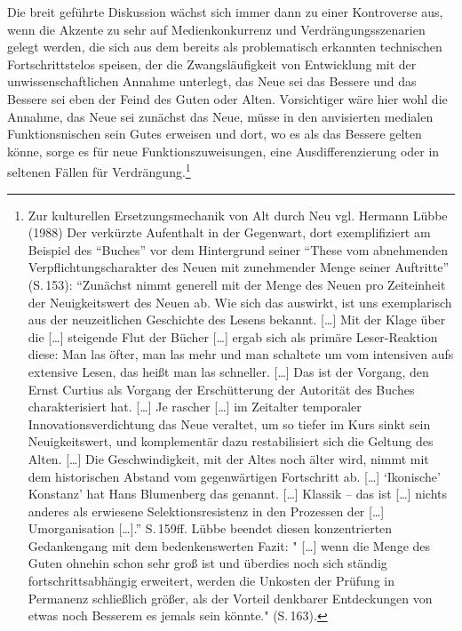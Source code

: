 \documentclass[a4paper,
fontsize=11pt,
oneside,
numbers=noperiodatend,
parskip=half-,
bibliography=totoc,
final
]{scrartcl}
\begin{document}
Die breit geführte Diskussion wächst sich immer dann zu einer
Kontroverse aus, wenn die Akzente zu sehr auf Medienkonkurrenz und
Verdrängungsszenarien gelegt werden, die sich aus dem bereits als
problematisch erkannten technischen Fortschrittstelos speisen, der die
Zwangsläufigkeit von Entwicklung mit der unwissenschaftlichen Annahme
unterlegt, das Neue sei das Bessere und das Bessere sei eben der Feind
des Guten oder Alten. Vorsichtiger wäre hier wohl die Annahme, das Neue
sei zunächst das Neue, müsse in den anvisierten medialen
Funktionsnischen sein Gutes erweisen und dort, wo es als das Bessere
gelten könne, sorge es für neue Funktionszuweisungen, eine
Ausdifferenzierung oder in seltenen Fällen für Verdrängung.\footnote{Zur
  kulturellen Ersetzungsmechanik von Alt durch Neu vgl. Hermann Lübbe
  (1988) Der verkürzte Aufenthalt in der Gegenwart, dort exemplifiziert
  am Beispiel des \enquote{Buches} vor dem Hintergrund seiner
  \enquote{These vom abnehmenden Verpflichtungscharakter des Neuen mit
  zunehmender Menge seiner Auftritte} (S.\,153): \enquote{Zunächst nimmt
  generell mit der Menge des Neuen pro Zeiteinheit der Neuigkeitswert
  des Neuen ab. Wie sich das auswirkt, ist uns exemplarisch aus der
  neuzeitlichen Geschichte des Lesens bekannt. {[}\ldots{}{]} Mit der
  Klage über die {[}\ldots{}{]} steigende Flut der Bücher {[}\ldots{}{]}
  ergab sich als primäre Leser-Reaktion diese: Man las öfter, man las
  mehr und man schaltete um vom intensiven aufs extensive Lesen, das
  heißt man las schneller. {[}\ldots{}{]} Das ist der Vorgang, den Ernst
  Curtius als Vorgang der Erschütterung der Autorität des Buches
  charakterisiert hat. {[}\ldots{}{]} Je rascher {[}\ldots{}{]} im
  Zeitalter temporaler Innovationsverdichtung das Neue veraltet, um so
  tiefer im Kurs sinkt sein Neuigkeitswert, und komplementär dazu
  restabilisiert sich die Geltung des Alten. {[}\ldots{}{]} Die
  Geschwindigkeit, mit der Altes noch älter wird, nimmt mit dem
  historischen Abstand vom gegenwärtigen Fortschritt ab. {[}\ldots{}{]}
  \enquote{Ikonische} Konstanz' hat Hans Blumenberg das genannt.
  {[}\ldots{}{]} Klassik -- das ist {[}\ldots{}{]} nichts anderes als
  erwiesene Selektionsresistenz in den Prozessen der {[}\ldots{}{]}
  Umorganisation {[}\ldots{}{]}.} S.\,159ff. Lübbe beendet diesen
  konzentrierten Gedankengang mit dem bedenkenswerten Fazit: "
  {[}\ldots{}{]} wenn die Menge des Guten ohnehin schon sehr groß ist
  und überdies noch sich ständig fortschrittsabhängig erweitert, werden
  die Unkosten der Prüfung in Permanenz schließlich größer, als der
  Vorteil denkbarer Entdeckungen von etwas noch Besserem es jemals sein
  könnte." (S.\,163).}
\end{document}

